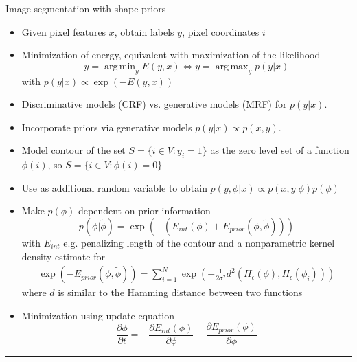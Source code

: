 \documentclass[mathserif,final,hyperref={pdfpagelabels=false}]{beamer} %
\def\Nu{ V }
\DeclareMathOperator*{\argmin}{arg\, min}					%
\DeclareMathOperator*{\argmax}{arg\, max}
\begin{document}
\begin{frame}
\begin{columns}
\begin{column1lti}
\begin{blocklti}{Image segmentation with shape priors}
\begin{itemize}
\item Given pixel features $x$, obtain labels $y$, pixel coordinates $i$ 
\item Minimization of energy, equivalent with maximization of the likelihood
\begin{equation*}
y = \argmin_y E(y,x) \iff y = \argmax_y p(y|x) 
\end{equation*}
with $p(y|x) \propto \exp(-E(y,x))$
\item Discriminative models (CRF) vs. generative models (MRF) for $p(y|x)$.
\item Incorporate priors via generative models $p(y|x) \propto p(x,y)$.
\end{itemize}

\vspace{1ex}

\begin{itemize}
\item Model contour of the set $S= \{i\in \Nu: y_i =1\}$  as the zero level set of a function $\phi(i)$, so $S = \{i\in\Nu: \phi(i) = 0\}$
\item Use as additional random variable to obtain $p(y,\phi|x) \propto p(x,y|\phi)p(\phi)$
\item Make $p(\phi)$ dependent on prior information
\begin{equation*}
p(\phi|\tilde{\phi}) = \exp(-( E_{int}(\phi) + E_{prior}(\phi,\tilde{\phi})))
\end{equation*}
with $E_{int}$ e.g. penalizing length of the contour and a nonparametric kernel density estimate for 
\begin{align*}
\exp(- E_{prior}(\phi,\tilde{\phi})) = \sum_{i=1}^N \exp\left(-\frac{1}{2\sigma^2}d^2(H_\epsilon(\phi),H_\epsilon(\phi_i))\right)
\end{align*}
where $d$ is similar to the Hamming distance between two functions
\item Minimization using update equation
\begin{equation*}
\frac{\partial \phi}{\partial t} = -\frac{\partial E_{int}(\phi)}{\partial \phi} - \frac{\partial E_{prior}(\phi)}{\partial \phi}  \label{labelset_update}
\end{equation*}
\end{itemize}

\hrule

\vspace{2ex}


\end{blocklti}
\end{column1lti}
\end{columns}
\end{frame}
\end{document}

